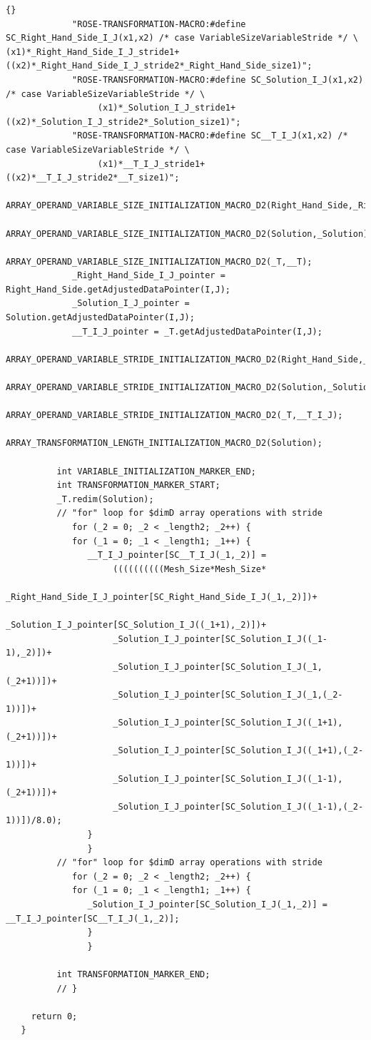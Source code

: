 \documentclass[10pt]{article}
\begin{document}
\begin{lstlisting}{}
             "ROSE-TRANSFORMATION-MACRO:#define SC_Right_Hand_Side_I_J(x1,x2) /* case VariableSizeVariableStride */ \                  (x1)*_Right_Hand_Side_I_J_stride1+((x2)*_Right_Hand_Side_I_J_stride2*_Right_Hand_Side_size1)"; 
             "ROSE-TRANSFORMATION-MACRO:#define SC_Solution_I_J(x1,x2) /* case VariableSizeVariableStride */ \
                  (x1)*_Solution_I_J_stride1+((x2)*_Solution_I_J_stride2*_Solution_size1)"; 
             "ROSE-TRANSFORMATION-MACRO:#define SC__T_I_J(x1,x2) /* case VariableSizeVariableStride */ \
                  (x1)*__T_I_J_stride1+((x2)*__T_I_J_stride2*__T_size1)"; 
             ARRAY_OPERAND_VARIABLE_SIZE_INITIALIZATION_MACRO_D2(Right_Hand_Side,_Right_Hand_Side);
             ARRAY_OPERAND_VARIABLE_SIZE_INITIALIZATION_MACRO_D2(Solution,_Solution);
             ARRAY_OPERAND_VARIABLE_SIZE_INITIALIZATION_MACRO_D2(_T,__T);
             _Right_Hand_Side_I_J_pointer = Right_Hand_Side.getAdjustedDataPointer(I,J); 
             _Solution_I_J_pointer = Solution.getAdjustedDataPointer(I,J); 
             __T_I_J_pointer = _T.getAdjustedDataPointer(I,J); 
          ARRAY_OPERAND_VARIABLE_STRIDE_INITIALIZATION_MACRO_D2(Right_Hand_Side,_Right_Hand_Side_I_J);
          ARRAY_OPERAND_VARIABLE_STRIDE_INITIALIZATION_MACRO_D2(Solution,_Solution_I_J);
          ARRAY_OPERAND_VARIABLE_STRIDE_INITIALIZATION_MACRO_D2(_T,__T_I_J);
          ARRAY_TRANSFORMATION_LENGTH_INITIALIZATION_MACRO_D2(Solution);
           
          int VARIABLE_INITIALIZATION_MARKER_END; 
          int TRANSFORMATION_MARKER_START; 
          _T.redim(Solution);
          // "for" loop for $dimD array operations with stride 
             for (_2 = 0; _2 < _length2; _2++) { 
             for (_1 = 0; _1 < _length1; _1++) { 
                __T_I_J_pointer[SC__T_I_J(_1,_2)] = 
                     ((((((((((Mesh_Size*Mesh_Size*
                     _Right_Hand_Side_I_J_pointer[SC_Right_Hand_Side_I_J(_1,_2)])+
                     _Solution_I_J_pointer[SC_Solution_I_J((_1+1),_2)])+
                     _Solution_I_J_pointer[SC_Solution_I_J((_1-1),_2)])+
                     _Solution_I_J_pointer[SC_Solution_I_J(_1,(_2+1))])+
                     _Solution_I_J_pointer[SC_Solution_I_J(_1,(_2-1))])+
                     _Solution_I_J_pointer[SC_Solution_I_J((_1+1),(_2+1))])+
                     _Solution_I_J_pointer[SC_Solution_I_J((_1+1),(_2-1))])+
                     _Solution_I_J_pointer[SC_Solution_I_J((_1-1),(_2+1))])+
                     _Solution_I_J_pointer[SC_Solution_I_J((_1-1),(_2-1))])/8.0); 
                } 
                } 
          // "for" loop for $dimD array operations with stride 
             for (_2 = 0; _2 < _length2; _2++) { 
             for (_1 = 0; _1 < _length1; _1++) { 
                _Solution_I_J_pointer[SC_Solution_I_J(_1,_2)] = __T_I_J_pointer[SC__T_I_J(_1,_2)]; 
                } 
                } 
           
          int TRANSFORMATION_MARKER_END; 
          // }
           
     return 0;
   }

\end{lstlisting}
\end{document}

